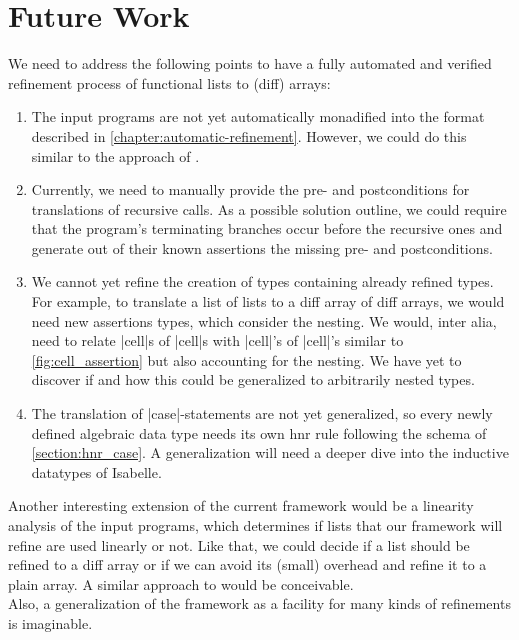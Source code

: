 \chapter{Future Work}\label{chapter:future_work}

We need to address the following points to have a fully automated and verified refinement process of functional lists to (diff) arrays:

\begin{enumerate}

\item The input programs are not yet automatically monadified into the format described in \autoref{chapter:automatic-refinement}. However, we could do this similar to the approach of \cite[p.2]{Wimmer_2018}.

\item Currently, we need to manually provide the pre- and postconditions for translations of recursive calls. As a possible solution outline, we could require that the program's terminating branches occur before the recursive ones and generate out of their known assertions the missing pre- and postconditions.

\item We cannot yet refine the creation of types containing already refined types. For example, to translate a list of lists to a diff array of diff arrays, we would need new assertions types, which consider the nesting. We would, inter alia, need to relate |cell|s of |cell|s with |cell|'s of |cell|'s similar to \autoref{fig:cell_assertion} but also accounting for the nesting. We have yet to discover if and how this could be generalized to arbitrarily nested types.

\item The translation of |case|-statements are not yet generalized, so every newly defined algebraic data type needs its own hnr rule following the schema of \autoref{section:hnr_case}. A generalization will need a deeper dive into the inductive datatypes of Isabelle.

\end{enumerate}

\noindent Another interesting extension of the current framework would be a linearity analysis of the input programs, which determines if lists that our framework will refine are used linearly or not. Like that, we could decide if a list should be refined to a diff array or if we can avoid its (small) overhead and refine it to a plain array. A similar approach to \cite{Bernardy_2017} would be conceivable.\\
Also, a generalization of the framework as a facility for many kinds of refinements is imaginable.
